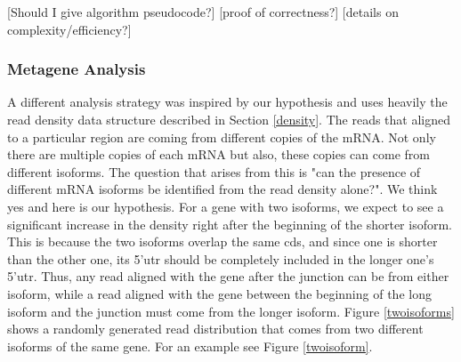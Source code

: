 \documentclass[12pt]{article}
\begin{document}
[Should I give algorithm pseudocode?]
[proof of correctness?]
[details on complexity/efficiency?]

\subsubsection{Metagene Analysis}\label{metagene_sect}
A different analysis strategy was inspired by our hypothesis and uses heavily the read density data structure described in Section \ref{density}. The reads that aligned to a particular region are coming from different copies of the mRNA. Not only there are multiple copies of each mRNA but also, these copies can come from different isoforms. The question that arises from this is "can the presence of different mRNA isoforms be identified from the read density alone?". We think yes and here is our hypothesis. For a gene with two isoforms, we expect to see a significant increase in the density right after the beginning of the shorter isoform. This is because the two isoforms overlap the same \acrshort{cds}, and since one is shorter than the other one, its 5'\acrshort{utr} should be completely included in the longer one's 5'\acrshort{utr}. Thus, any read aligned with the gene after the junction can be from either isoform, while a read aligned with the gene between the beginning of the long isoform and the junction must come from the longer isoform. Figure \ref{twoisoforms} shows a randomly generated read distribution that comes from two different isoforms of the same gene. For an example see Figure \ref{twoisoform}. 


\end{document}
